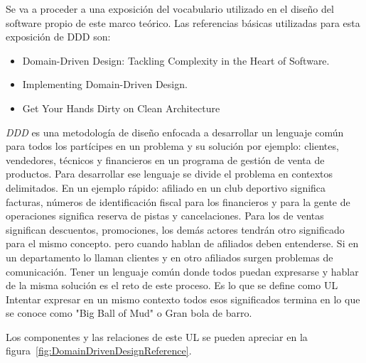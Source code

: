 
Se va a proceder a una exposición del vocabulario utilizado en el diseño del software propio de este marco teórico. Las referencias básicas utilizadas para esta exposición de \gls{DDD} son:

\begin{itemize}
    \item Domain-Driven Design: Tackling Complexity in the Heart of Software.\cite{EricEvans2003DDTC}
    \item Implementing Domain-Driven Design.\cite{VaughnVernon2013IDD}
    \item Get Your Hands Dirty on Clean Architecture\cite{TomHombergs2019GYHD}
\end{itemize}

\textit{DDD} es una metodología de diseño enfocada a desarrollar un lenguaje común para todos los partícipes en un problema y su solución por ejemplo: clientes, vendedores, técnicos y financieros en un programa de gestión de venta de productos. Para desarrollar ese lenguaje se divide el problema en contextos delimitados. En un ejemplo rápido: afiliado en un club deportivo significa facturas, números de identificación fiscal para los financieros y para la gente de operaciones significa reserva de pistas y cancelaciones. Para los de ventas significan descuentos, promociones, los demás actores tendrán otro significado para el mismo concepto. pero cuando hablan de afiliados deben entenderse. Si en un departamento lo llaman clientes y en otro afiliados surgen problemas de comunicación. Tener un lenguaje común donde todos puedan expresarse y hablar de la misma solución es el reto de este proceso. Es lo que se define como \gls{UL} Intentar expresar en un mismo contexto todos esos significados termina en lo que se conoce como "Big Ball of Mud" o Gran bola de barro.


Los componentes y las relaciones de este UL se pueden apreciar en la figura~\cref{fig:DomainDrivenDesignReference}.

